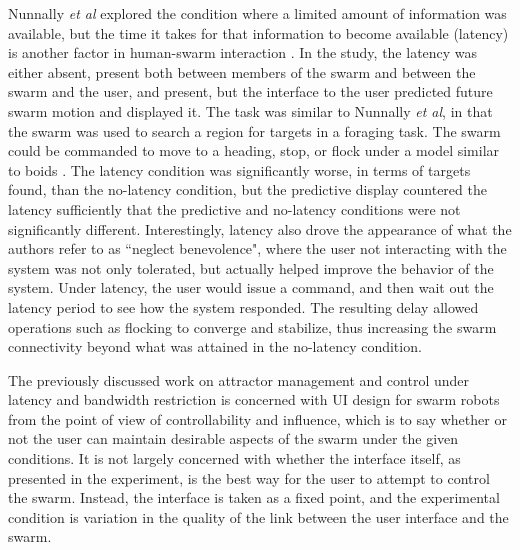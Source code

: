 Nunnally \emph{et al} explored the condition where a limited amount of information was available, but the time it takes for that information to become available (latency) is another factor in human-swarm interaction \citep{walker2012neglect}.
In the study, the latency was either absent, present both between members of the swarm and between the swarm and the user, and present, but the interface to the user predicted future swarm motion and displayed it. 
The task was similar to Nunnally \emph{et al}, in that the swarm was used to search a region for targets in a foraging task. 
The swarm could be commanded to move to a heading, stop, or flock under a model similar to boids \citep{reynolds1987flocks}.
The latency condition was significantly worse, in terms of targets found, than the no-latency condition, but the predictive display countered the latency sufficiently that the predictive and no-latency conditions were not significantly different. 
Interestingly, latency also drove the appearance of what the authors refer to as ``neglect benevolence", where the user not interacting with the system was not only tolerated, but actually helped improve the behavior of the system. 
Under latency, the user would issue a command, and then wait out the latency period to see how the system responded.
The resulting delay allowed operations such as flocking to converge and stabilize, thus increasing the swarm connectivity beyond what was attained in the no-latency condition. 

The previously discussed work on attractor management and control under latency and bandwidth restriction is concerned with UI design for swarm robots from the point of view of controllability and influence, which is to say whether or not the user can maintain desirable aspects of the swarm under the given conditions. 
It is not largely concerned with whether the interface itself, as presented in the experiment, is the best way for the user to attempt to control the swarm.
Instead, the interface is taken as a fixed point, and the experimental condition is variation in the quality of the link between the user interface and the swarm. 


